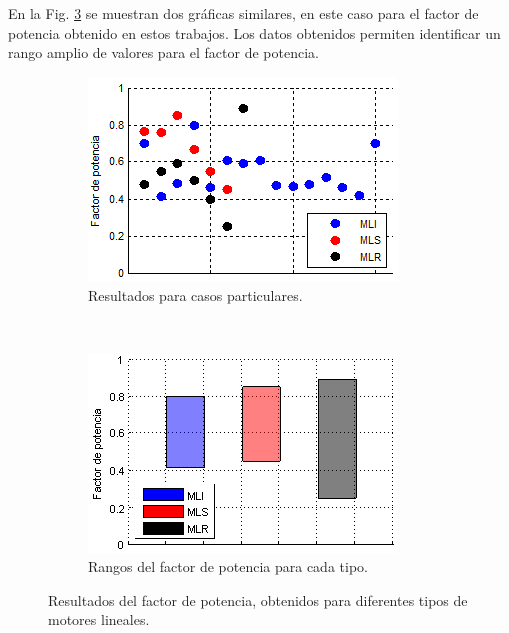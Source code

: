 En la Fig. \ref{fig:pfs} se muestran dos gráficas similares, en este caso para el factor de potencia obtenido en estos trabajos. Los datos obtenidos permiten identificar un rango amplio de valores para el factor de potencia.

\begin{figure}[t]
    \centering
    \begin{subfigure}[b]{0.49\textwidth}
        \includegraphics[width=\textwidth]{../img/pfdata.PNG}
        \caption{Resultados para casos particulares.}
        \label{fig:pfdata}
    \end{subfigure}
    ~ %
    \begin{subfigure}[b]{0.49\textwidth}
        \includegraphics[width=\textwidth]{../img/pfbands.PNG}
        \caption{Rangos del factor de potencia para cada tipo.}
        \label{fig:pfbands}
    \end{subfigure}
    \caption{Resultados del factor de potencia, obtenidos para diferentes tipos de motores lineales.}\label{fig:pfs}
\end{figure}

